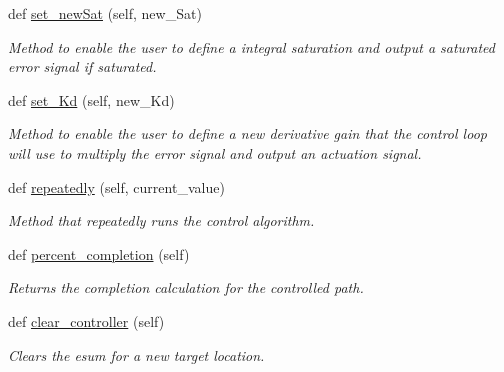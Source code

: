 \begin{DoxyCompactItemize}
def \hyperlink{classcontroller_1_1Controller_a49fa05357ea552c4582fec518296c6b9}{set\+\_\+new\+Sat} (self, new\+\_\+\+Sat)
\begin{DoxyCompactList}\small\item\em Method to enable the user to define a integral saturation and output a saturated error signal if saturated. \end{DoxyCompactList}\item 
def \hyperlink{classcontroller_1_1Controller_ad00c089df25898872508fa038105b728}{set\+\_\+\+Kd} (self, new\+\_\+\+Kd)
\begin{DoxyCompactList}\small\item\em Method to enable the user to define a new derivative gain that the control loop will use to multiply the error signal and output an actuation signal. \end{DoxyCompactList}\item 
def \hyperlink{classcontroller_1_1Controller_abe90cd53f3b1712fb253c0feaad18a0d}{repeatedly} (self, current\+\_\+value)
\begin{DoxyCompactList}\small\item\em Method that repeatedly runs the control algorithm. \end{DoxyCompactList}\item 
def \hyperlink{classcontroller_1_1Controller_afa5d03dfb05c626390315a989b8db1fa}{percent\+\_\+completion} (self)
\begin{DoxyCompactList}\small\item\em Returns the completion calculation for the controlled path. \end{DoxyCompactList}\item 
def \hyperlink{classcontroller_1_1Controller_afa5fa8bbe4614f550a6a96ac1869871a}{clear\+\_\+controller} (self)\hypertarget{classcontroller_1_1Controller_afa5fa8bbe4614f550a6a96ac1869871a}{}\label{classcontroller_1_1Controller_afa5fa8bbe4614f550a6a96ac1869871a}

\begin{DoxyCompactList}\small\item\em Clears the esum for a new target location. \end{DoxyCompactList}\end{DoxyCompactItemize}
